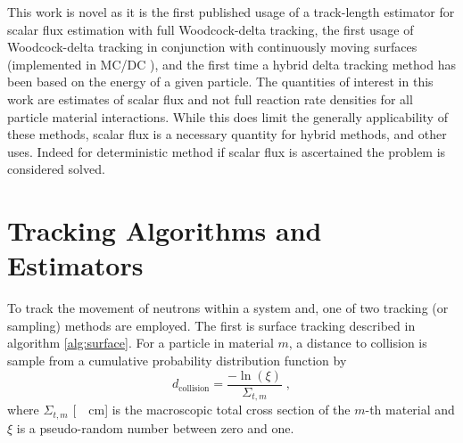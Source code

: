 This work is novel as it is the first published usage of a track-length estimator for scalar flux estimation with full Woodcock-delta tracking, the first usage of Woodcock-delta tracking in conjunction with continuously moving surfaces (implemented in MC/DC \cite{variansyah_2023_highfidelity}), and the first time a hybrid delta tracking method has been based on the energy of a given particle.
The quantities of interest in this work are estimates of scalar flux and not full reaction rate densities for all particle material interactions.
While this does limit the generally applicability of these methods, scalar flux is a necessary quantity for hybrid methods, and other uses.
Indeed for deterministic method if scalar flux is ascertained the problem is considered solved.


\section{Tracking Algorithms and Estimators}
\label{sec:tracking_algs_and_est}

To track the movement of neutrons within a system and, one of two tracking (or sampling) methods are employed. 
The first is surface tracking described in algorithm \ref{alg:surface}. 
For a particle in material $m$, a distance to collision is sample from a cumulative probability distribution function by
\begin{equation}
    d_{\text{collision}} = \frac{-\ln(\xi)}{\Sigma_{t,m}} \; ,
\end{equation}
where $\Sigma_{t,m}$ [\SI{}{\per\centi\meter}] is the macroscopic total cross section of the $m$-th material and $\xi$ is a pseudo-random number between zero and one.


